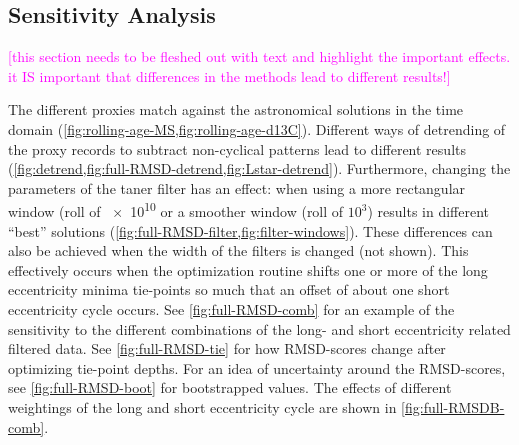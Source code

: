 \documentclass[draft]{agujournal2019}
\newcommand{\rez}{\textcolor{magenta}}
\begin{document}
\subsection{Sensitivity Analysis}

\rez{[this section needs to be fleshed out with text and highlight the important effects. it IS important
that differences in the methods lead to different results!]}

The different proxies match against the astronomical solutions in the time domain (\cref{fig:rolling-age-MS,fig:rolling-age-d13C}).
Different ways of detrending of the proxy records to subtract non-cyclical patterns lead to different results (\cref{fig:detrend,fig:full-RMSD-detrend,fig:Lstar-detrend}).
Furthermore, changing the parameters of the taner filter has an effect: when using a more rectangular window (roll of \num{e10} or a smoother window (roll of \(10^{3}\)) results in different ``best'' solutions (\cref{fig:full-RMSD-filter,fig:filter-windows}).
These differences can also be achieved when the width of the filters is changed (not shown). %
This effectively occurs when the optimization routine shifts one or more of the long eccentricity minima tie-points so much that an offset of about one short eccentricity cycle occurs.
See \cref{fig:full-RMSD-comb} for an example of the sensitivity to the different combinations of the long- and short eccentricity related filtered data.
See \cref{fig:full-RMSD-tie} for how \gls{RMSD}-scores change after optimizing tie-point depths.
For an idea of uncertainty around the \gls{RMSD}-scores, see \cref{fig:full-RMSD-boot} for bootstrapped values.
The effects of different weightings of the long and short eccentricity cycle are shown in \cref{fig:full-RMSDB-comb}.
\end{document}
